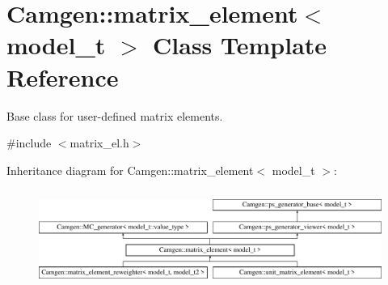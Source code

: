 \hypertarget{a00359}{\section{Camgen\-:\-:matrix\-\_\-element$<$ model\-\_\-t $>$ Class Template Reference}
\label{a00359}
}


Base class for user-\/defined matrix elements.  




{\ttfamily \#include $<$matrix\-\_\-el.\-h$>$}

Inheritance diagram for Camgen\-:\-:matrix\-\_\-element$<$ model\-\_\-t $>$\-:\begin{figure}[H]
\begin{center}
\leavevmode
\includegraphics[height=3.218391cm]{a00359}
\end{center}
\end{figure}

